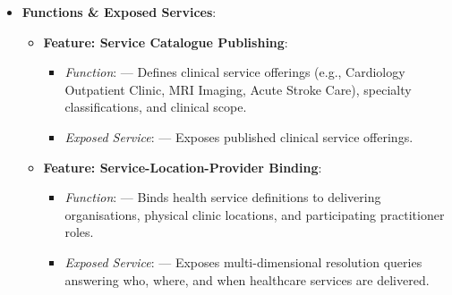 \begin{itemize}
\begin{itemize}
\begin{enumerate}
\item 
\emph{Where can Service X be obtained?}



\item 
\emph{Which Practitioner Roles participate in Service X?}



\end{enumerate}


\end{itemize}


\item 
\textbf{Functions \& Exposed Services}:


\begin{itemize}

\item 
\textbf{Feature: Service Catalogue Publishing}:


\begin{itemize}

\item 
\emph{Function}: \texttt{} — Defines clinical service offerings (e.g., Cardiology Outpatient Clinic, MRI Imaging, Acute Stroke Care), specialty classifications, and clinical scope.



\item 
\emph{Exposed Service}: \texttt{} — Exposes published clinical service offerings.



\end{itemize}


\item 
\textbf{Feature: Service-Location-Provider Binding}:


\begin{itemize}

\item 
\emph{Function}: \texttt{} — Binds health service definitions to delivering organisations, physical clinic locations, and participating practitioner roles.



\item 
\emph{Exposed Service}: \texttt{} — Exposes multi-dimensional resolution queries answering who, where, and when healthcare services are delivered.




\end{itemize}
\end{itemize}
\end{itemize}
